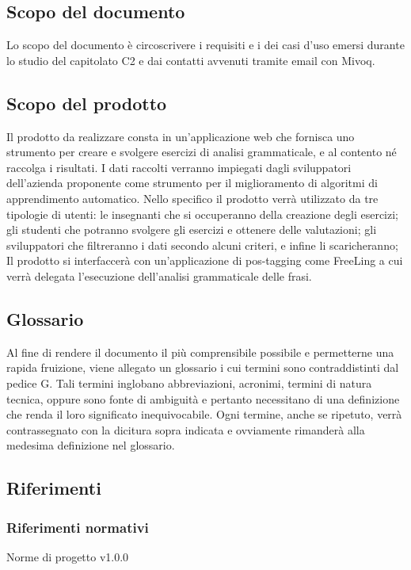 \subsection{Scopo del documento}
Lo scopo del documento è circoscrivere i requisiti e i dei casi d’uso emersi durante lo studio del capitolato C2 e dai contatti avvenuti tramite email con Mivoq.
\subsection{Scopo del prodotto}
Il prodotto da realizzare consta in un’applicazione web che fornisca uno strumento per creare e svolgere esercizi di analisi grammaticale, e al contento né raccolga i risultati. I dati raccolti verranno impiegati dagli sviluppatori dell’azienda proponente come strumento per il miglioramento di algoritmi di apprendimento automatico. Nello specifico il prodotto verrà utilizzato da tre tipologie di utenti:
le insegnanti che si occuperanno della creazione degli esercizi;
gli studenti che potranno svolgere gli esercizi e ottenere delle valutazioni; 
gli sviluppatori che filtreranno i dati secondo alcuni criteri, e infine li scaricheranno;\\Il prodotto si interfaccerà con un’applicazione di pos-tagging come FreeLing a cui verrà delegata l’esecuzione dell’analisi grammaticale delle frasi.
\subsection{Glossario}
Al fine di rendere il documento il più comprensibile possibile e permetterne una rapida fruizione, viene allegato un glossario i cui termini sono contraddistinti dal pedice G. Tali termini inglobano abbreviazioni, acronimi, termini di natura tecnica, oppure sono fonte di ambiguità e pertanto necessitano di una definizione che renda il loro significato inequivocabile. 
Ogni termine, anche se ripetuto, verrà contrassegnato con la dicitura sopra indicata e ovviamente rimanderà alla medesima definizione nel glossario.
\subsection{Riferimenti}
\subsubsection{Riferimenti normativi}
Norme di progetto v1.0.0
